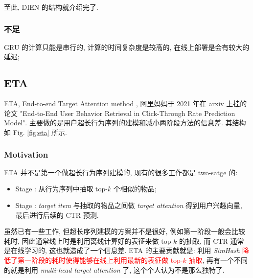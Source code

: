 至此, DIEN 的结构就介绍完了.

\subsubsection{不足}
\begin{myitemize}
	\item GRU 的计算只能是串行的, 计算的时间复杂度是较高的, 在线上部署是会有较大的延迟;
\end{myitemize}


\subsection{ETA}
ETA, End-to-end Target Attention method , 阿里妈妈于 2021 年在 arxiv 上挂的论文 "End-to-End User Behavior Retrieval in Click-Through Rate Prediction Model". 主要做的是用户超长行为序列的建模和减小两阶段方法的信息差. 其结构如 Fig. \ref{fig:eta} 所示.

\subsubsection{Motivation}
ETA 并不是第一个做超长行为序列建模的, 现有的很多工作都是 two-satge 的:  
\begin{itemize}
	\item Stage \uppercase\expandafter{}: 从行为序列中抽取 top-$k$ 个相似的物品; 
	
	\item Stage \uppercase\expandafter{}: \textit{target item} 与抽取的物品之间做 \textit{target attention} 得到用户兴趣向量, 最后进行后续的 CTR 预测.
\end{itemize}

虽然已有一些工作, 但超长序列建模的方案并不是很好, 例如第一阶段一般会比较耗时, 因此通常线上时是利用离线计算好的表征来做 top-$k$ 的抽取, 而 CTR 通常是在线学习的, 这也就造成了一个信息差. ETA 的主要贡献就是: 利用 \textit{SimHash} \textcolor{red}{降低了第一阶段的耗时使得能够在线上利用最新的表征做 top-$k$ 抽取}, 再有一个不同的就是利用 \textit{multi-head target attention} 了, 这个个人认为不是那么独特了.

